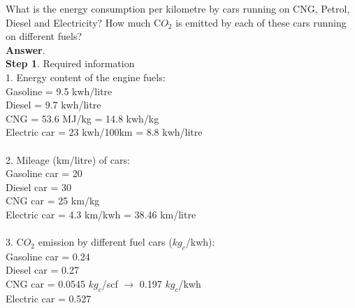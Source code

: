 \documentclass[11pt]{exam}
\begin{document}
\begin{questions}
\question
\label{Q24:Energy consumption and C$O_{2}$ emission of cars running on different fuels.}
What is the energy consumption per kilometre by cars running on CNG, Petrol, Diesel and Electricity? How much C$O_{2}$ is emitted by each of these cars running on different fuels? \\
\textbf{Answer}. \\
\textbf{Step 1}. Required information \\
                 1. Energy content of the engine fuels: \\
                    Gasoline = 9.5 kwh/litre \\
                    Diesel = 9.7 kwh/litre \\
                    CNG = 53.6 MJ/kg = 14.8 kwh/kg\\ %
                    Electric car = 23 kwh/100km = 8.8 kwh/litre\\
                    \\
                 2. Mileage (km/litre) of cars: \\
                    Gasoline car = 20 \\
                    Diesel car =  30  \\
                    CNG car  =   25 km/kg  \\
                    Electric car = 4.3 km/kwh = 38.46 km/litre  \\
                    \\
                 3. C$O_{2}$ emission by different fuel cars ($kg_{c}$/kwh): \\
                    Gasoline car =  0.24 \\
                    Diesel car =  0.27  \\
                    CNG car =  0.0545 $kg_{c}$/scf $\rightarrow$  0.197 $kg_{c}$/kwh \\ %
                    Electric car =  0.527  \\
                 

\end{questions}
\end{document}
